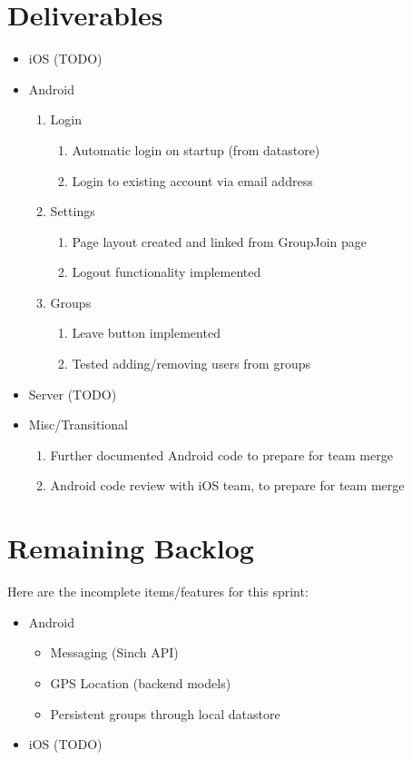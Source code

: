 \documentclass[11pt]{article}
\begin{document}
\section*{Deliverables}
	\begin{itemize}
	\item iOS
		(TODO)
		
	\item Android
		\begin{enumerate}
		\item Login
			\begin{enumerate}
			\item Automatic login on startup (from datastore)
			\item Login to existing account via email address
			\end{enumerate}
		\item Settings
			\begin{enumerate}
			\item Page layout created and linked from GroupJoin page
			\item Logout functionality implemented
			\end{enumerate}
		\item Groups
			\begin{enumerate}
			\item Leave button implemented
			\item Tested adding/removing users from groups
			\end{enumerate}
		\end{enumerate}
	\item Server
		(TODO)

	\item Misc/Transitional
		\begin{enumerate}
			\item Further documented Android code to prepare for team merge
			\item Android code review with iOS team, to prepare for team merge
		\end{enumerate}

	\end{itemize}

\section*{Remaining Backlog}
Here are the incomplete items/features for this sprint:
	\begin{itemize}
		\item Android
		\begin{itemize}
			\item Messaging (Sinch API)
			\item GPS Location (backend models)
			\item Persistent groups through local datastore
		\end{itemize}
		
		\item iOS (TODO)
	\end{itemize}
\end{document}
